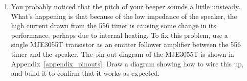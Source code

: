 \begin{enumerate}[wide]
\item You probably noticed that the pitch of your beeper sounds a little unsteady.  What's happening is that because of the low impedance of the speaker, the high current drawn from the 556 timer is causing some change in its performance, perhaps due to internal heating.  To fix this problem, use a single MJE3055T transistor as an emitter follower amplifier between the 556 timer and the speaker.  The pin-out diagram of the MJE3055T is shown in Appendix~\ref{appendix_pinouts}.  Draw a diagram showing how to wire this up, and build it to confirm that it works as expected.
\end{enumerate}







